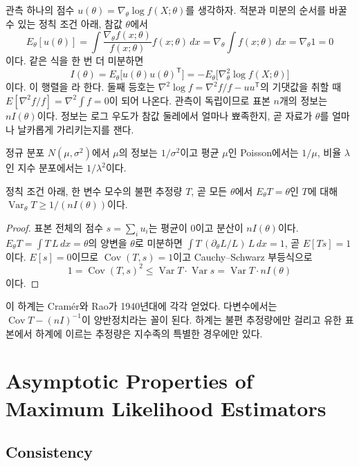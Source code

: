 관측 하나의 점수 $u(\theta)=\nabla_\theta\log f(X;\theta)$를 생각하자. 적분과 미분의 순서를 바꿀 수 있는 정칙 조건 아래, 참값 $\theta$에서
\[
E_\theta[u(\theta)]=\int\frac{\nabla_\theta f(x;\theta)}{f(x;\theta)}f(x;\theta)\,dx=\nabla_\theta\int f(x;\theta)\,dx=\nabla_\theta1=0
\]
이다. 같은 식을 한 번 더 미분하면
\[
I(\theta)=E_\theta\bigl[u(\theta)u(\theta)^{\mathsf T}\bigr]=-E_\theta\bigl[\nabla^2_\theta\log f(X;\theta)\bigr]
\]
이다. 이 행렬을 라 한다. 둘째 등호는 $\nabla^2\log f=\nabla^2f/f-uu^{\mathsf T}$의 기댓값을 취할 때 $E[\nabla^2f/f]=\nabla^2\int f=0$이 되어 나온다. 관측이 독립이므로 표본 $n$개의 정보는 $nI(\theta)$이다. 정보는 로그 우도가 참값 둘레에서 얼마나 뾰족한지, 곧 자료가 $\theta$를 얼마나 날카롭게 가리키는지를 잰다.

정규 분포 $N(\mu,\sigma^2)$에서 $\mu$의 정보는 $1/\sigma^2$이고 평균 $\mu$인 Poisson에서는 $1/\mu$, 비율 $\lambda$인 지수 분포에서는 $1/\lambda^2$이다.

\begin{theorem}
\label{thm:cramer-rao}
정칙 조건 아래, 한 변수 모수의 불편 추정량 $T$, 곧 모든 $\theta$에서 $E_\theta T=\theta$인 $T$에 대해 $\operatorname{Var}_\theta T\ge1/(nI(\theta))$이다.
\end{theorem}

\begin{proof}
표본 전체의 점수 $s=\sum_iu_i$는 평균이 $0$이고 분산이 $nI(\theta)$이다. $E_\theta T=\int T\,L\,dx=\theta$의 양변을 $\theta$로 미분하면 $\int T\,(\partial_\theta L/L)\,L\,dx=1$, 곧 $E[Ts]=1$이다. $E[s]=0$이므로 $\operatorname{Cov}(T,s)=1$이고 Cauchy--Schwarz 부등식으로
\[
1=\operatorname{Cov}(T,s)^2\le\operatorname{Var}T\cdot\operatorname{Var}s=\operatorname{Var}T\cdot nI(\theta)
\]
이다.
\end{proof}

이 하계는 Cramér와 Rao가 1940년대에 각각 얻었다\cite{cramer1946,rao1945}. 다변수에서는 $\operatorname{Cov}T-(nI)^{-1}$이 양반정치라는 꼴이 된다. 하계는 불편 추정량에만 걸리고 유한 표본에서 하계에 이르는 추정량은 지수족의 특별한 경우에만 있다.

\section{Asymptotic Properties of Maximum Likelihood Estimators}
\label{sec:mle-asymptotics}

\subsection{Consistency}

